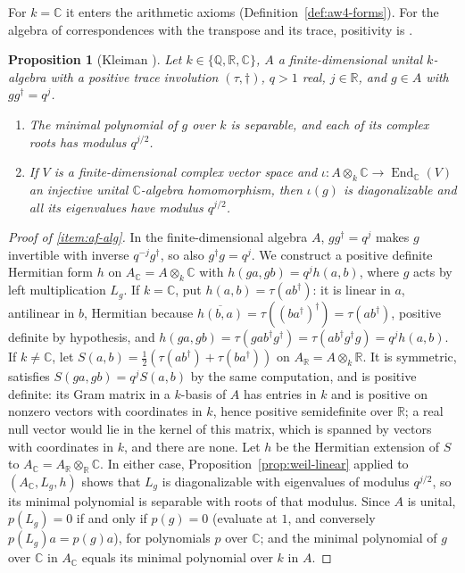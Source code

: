 \documentclass[11pt]{amsart}
\theoremstyle{plain}
\newtheorem{proposition}[theorem]{Proposition}
\theoremstyle{definition}
\theoremstyle{remark}
\numberwithin{equation}{section}
\newcommand{\C}{\mathbb{C}}
\newcommand{\R}{\mathbb{R}}
\newcommand{\Q}{\mathbb{Q}}
\begin{document}
For $k=\C$ it enters the arithmetic axioms
(Definition~\ref{def:aw4-forms}). For the algebra of correspondences
with the transpose and its trace, positivity is
\cite[3.11 and Lemma~4.6]{Kleiman1968Cycles}.

\begin{proposition}[{Kleiman \cite[Lemma~4.6, p.~385]{Kleiman1968Cycles}}]%
\label{prop:algebra-form}
Let $k\in\{\Q,\R,\C\}$, $A$ a finite-dimensional unital $k$-algebra
with a positive trace involution $(\tau,\dagger)$, $q>1$ real, $j\in\R$,
and $g\in A$ with $gg^\dagger=q^j$.
\begin{enumerate}[label=(\roman*)]
\item\label{item:af-alg} The minimal polynomial of $g$ over $k$ is
  separable, and each of its complex roots has modulus $q^{j/2}$.
\item\label{item:af-rep} If $V$ is a finite-dimensional complex vector
  space and $\iota:A\otimes_k\C\to\operatorname{End}_\C(V)$ an injective
  unital $\C$-algebra homomorphism, then $\iota(g)$ is diagonalizable and all
  its eigenvalues have modulus $q^{j/2}$.
\end{enumerate}
\end{proposition}

\begin{proof}[Proof of \ref{item:af-alg}]
In the finite-dimensional algebra $A$, $gg^\dagger=q^j$ makes $g$
invertible with inverse $q^{-j}g^\dagger$, so also $g^\dagger g=q^j$.
We construct a positive definite Hermitian form $h$ on
$A_\C=A\otimes_k\C$ with $h(ga,gb)=q^jh(a,b)$, where $g$ acts by left
multiplication $L_g$. If $k=\C$, put $h(a,b)=\tau(ab^\dagger)$: it is
linear in $a$, antilinear in $b$, Hermitian because
$\overline{h(b,a)}=\tau((ba^\dagger)^\dagger)=\tau(ab^\dagger)$, positive
definite by hypothesis, and $h(ga,gb)=\tau(gab^\dagger g^\dagger)=
\tau(ab^\dagger g^\dagger g)=q^jh(a,b)$. If $k\ne\C$, let
$S(a,b)=\tfrac12(\tau(ab^\dagger)+\tau(ba^\dagger))$ on
$A_\R=A\otimes_k\R$. It is symmetric, satisfies $S(ga,gb)=q^jS(a,b)$ by
the same computation, and is positive definite: its Gram matrix in a
$k$-basis of $A$ has entries in $k$ and is positive on nonzero vectors
with coordinates in $k$, hence positive semidefinite over $\R$; a real
null vector would lie in the kernel of this matrix, which is spanned by
vectors with coordinates in $k$, and there are none. Let $h$ be the
Hermitian extension of $S$ to $A_\C=A_\R\otimes_\R\C$. In either case,
Proposition~\ref{prop:weil-linear} applied to $(A_\C,L_g,h)$ shows that
$L_g$ is diagonalizable with eigenvalues of modulus $q^{j/2}$, so its
minimal polynomial is separable with roots of that modulus. Since $A$ is
unital, $p(L_g)=0$ if and only if $p(g)=0$ (evaluate at $1$, and
conversely $p(L_g)a=p(g)a$), for polynomials $p$ over $\C$; and the
minimal polynomial of $g$ over $\C$ in $A_\C$ equals its minimal
polynomial over $k$ in $A$.
\end{proof}
\end{document}
